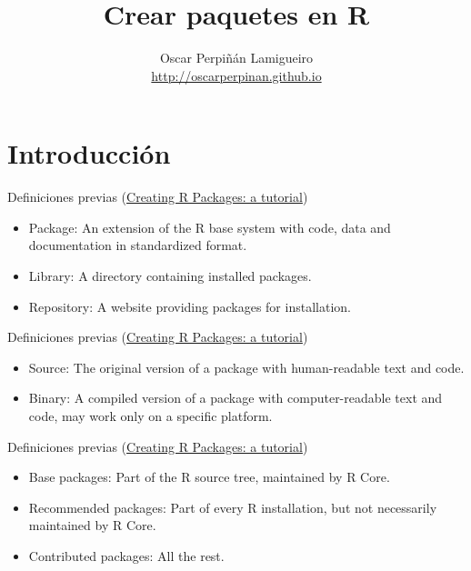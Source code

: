 \documentclass[xcolor={usenames,svgnames,dvipsnames}]{beamer}
\author{Oscar Perpiñán Lamigueiro \\ \url{http://oscarperpinan.github.io}}
\date{}
\title{Crear paquetes en R}
\begin{document}
\maketitle


\section{Introducción}
\label{sec:org779bba6}

\begin{frame}[label={sec:org56cfd04}]{Definiciones previas (\href{http://cran.r-project.org/doc/contrib/Leisch-CreatingPackages.pdf}{Creating R Packages: a tutorial})}
\begin{itemize}
\item \alert{Package}: An extension of the R base system with code, data and
documentation in standardized format.
\item \alert{Library}: A directory containing installed packages.
\item \alert{Repository}: A website providing packages for installation.
\end{itemize}
\end{frame}

\begin{frame}[label={sec:org1b8624b}]{Definiciones previas (\href{http://cran.r-project.org/doc/contrib/Leisch-CreatingPackages.pdf}{Creating R Packages: a tutorial})}
\begin{itemize}
\item \alert{Source}: The original version of a package with human-readable text and code.
\item \alert{Binary}: A compiled version of a package with computer-readable
text and code, may work only on a specific platform.
\end{itemize}
\end{frame}

\begin{frame}[label={sec:org203b2ad}]{Definiciones previas (\href{http://cran.r-project.org/doc/contrib/Leisch-CreatingPackages.pdf}{Creating R Packages: a tutorial})}
\begin{itemize}
\item \alert{Base packages}: Part of the R source tree, maintained by R Core.
\item \alert{Recommended packages}: Part of every R installation, but not
necessarily maintained by R Core.
\item \alert{Contributed packages}: All the rest.
\end{itemize}
\end{frame}
\end{document}
